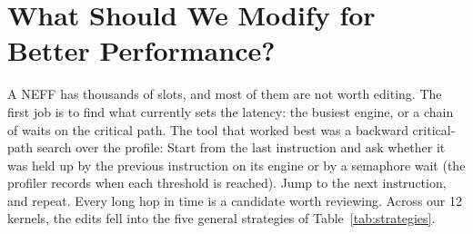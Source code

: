 \documentclass{article}
\begin{document}
\section{What Should We Modify for Better Performance?}
\label{sec:strategy}

A NEFF has thousands of slots, and most of them are not worth editing. The first job is to find what currently sets the latency: the busiest engine, or a chain of waits on the critical path. The tool that worked best was a backward critical-path search over the profile: Start from the last instruction and ask whether it was held up by the previous instruction on its engine or by a semaphore wait (the profiler records when each threshold is reached). Jump to the next instruction, and repeat. Every long hop in time is a candidate worth reviewing. Across our 12 kernels, the edits fell into the five general strategies of Table~\ref{tab:strategies}.
\end{document}
